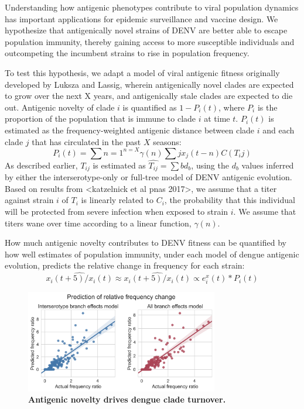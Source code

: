 \documentclass[11pt,oneside,letterpaper]{article}
\begin{document}
Understanding how antigenic phenotypes contribute to viral population dynamics has important applications for epidemic surveillance and vaccine design.
We hypothesize that antigenically novel strains of DENV are better able to escape population immunity, thereby gaining access to more susceptible individuals and outcompeting the incumbent strains to rise in population frequency.

To test this hypothesis, we adapt a model of viral antigenic fitness originally developed by Luksza and Lassig, wherein antigenically novel clades are expected to grow over the next X years, and antigenically stale clades are expected to die out.
Antigenic novelty of clade $i$ is quantified as $1 - P_i(t)$, where $P_i$ is the proportion of the population that is immune to clade $i$ at time $t$.
$P_i(t)$ is estimated as the frequency-weighted antigenic distance between clade $i$ and each clade $j$ that has circulated in the past $X$ seasons:  $$P_i(t) = \sum{n=1}^{n=X} \gamma(n) \sum{j} x_j(t-n) C(T_ij)$$
As described earlier, $T_{ij}$ is estimated as $\hat{T_{ij}} = \sum{b} d_b$, using the $d_b$ values inferred by either the interserotype-only or full-tree model of DENV antigenic evolution.
Based on results from <katzelnick et al pnas 2017>, we assume that a titer against strain $i$ of $T_i$ is linearly related to $C_i$, the  probability that this individual will be protected from severe infection when exposed to strain $i$.
We assume that titers wane over time according to a linear function, $\gamma(n)$.

How much antigenic novelty contributes to DENV fitness can be quantified by how well estimates of population immunity, under each model of dengue antigenic evolution, predicts the relative change in frequency for each strain: $$\hat{x_i(t+5)/x_i(t)} \approx \hat{x_i(t+5)/x_i(t)} \propto e^x_i(t) * P_i(t)$$

\begin{figure}[h]
 \centering
	\includegraphics[width=0.75\textwidth]{figs/frequency_predictions.png}
	\caption{\textbf{
Antigenic novelty drives dengue clade turnover.
}}
	\label{frequency_predictions}
\end{figure}
\end{document}
